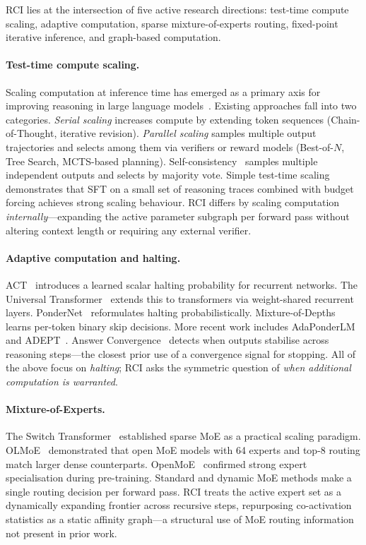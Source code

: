 \documentclass{article}
\begin{document}
RCI lies at the intersection of five active research directions:
test-time compute scaling, adaptive computation, sparse
mixture-of-experts routing, fixed-point iterative inference, and
graph-based computation.

\paragraph{Test-time compute scaling.}
Scaling computation at inference time has emerged as a primary
axis for improving reasoning in large language
models~\citep{snell2024scaling, agarwal2025art}.
Existing approaches fall into two categories.
\textit{Serial scaling} increases compute by extending token
sequences (Chain-of-Thought, iterative revision).
\textit{Parallel scaling} samples multiple output trajectories
and selects among them via verifiers or reward models
(Best-of-$N$, Tree Search, MCTS-based planning).
Self-consistency~\citep{wang2022selfconsistency} samples multiple
independent outputs and selects by majority vote.
Simple test-time scaling~\citep{muennighoff2025s1} demonstrates
that SFT on a small set of reasoning traces combined with budget
forcing achieves strong scaling behaviour.
RCI differs by scaling computation \textit{internally}---expanding
the active parameter subgraph per forward pass without altering
context length or requiring any external verifier.

\paragraph{Adaptive computation and halting.}
ACT~\citep{graves2016act} introduces a learned scalar halting
probability for recurrent networks.
The Universal Transformer~\citep{dehghani2019universal} extends
this to transformers via weight-shared recurrent layers.
PonderNet~\citep{banino2021pondernet} reformulates halting
probabilistically.
Mixture-of-Depths~\citep{raposo2024mod} learns per-token binary
skip decisions.
More recent work includes AdaPonderLM~\citep{adaponderlm2025} and
ADEPT~\citep{adept2026}.
Answer Convergence~\citep{liu2025answerconv} detects when outputs
stabilise across reasoning steps---the closest prior use of a
convergence signal for stopping.
All of the above focus on \textit{halting}; RCI asks the symmetric
question of \textit{when additional computation is warranted}.

\paragraph{Mixture-of-Experts.}
The Switch Transformer~\citep{fedus2021switch} established sparse
MoE as a practical scaling paradigm.
OLMoE~\citep{muennighoff2024olmoe} demonstrated that open MoE
models with 64 experts and top-8 routing match larger dense
counterparts.
OpenMoE~\citep{xue2024openmoe} confirmed strong expert
specialisation during pre-training.
Standard and dynamic MoE methods make a single routing decision
per forward pass.
RCI treats the active expert set as a dynamically expanding
frontier across recursive steps, repurposing co-activation
statistics as a static affinity graph---a structural use of MoE
routing information not present in prior work.
\end{document}

